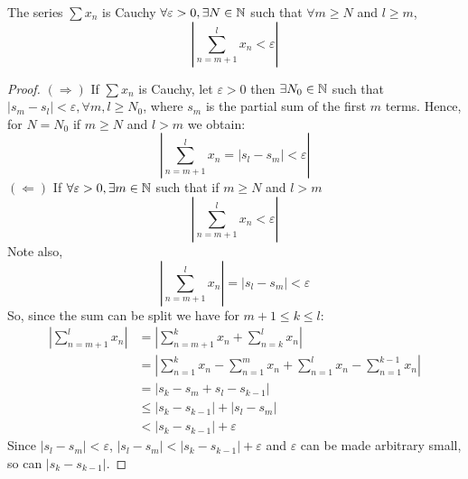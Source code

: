 \begin{theorem}
    The series $\sum x_n$ is Cauchy $\forall \varepsilon > 0, \exists N \in \mathbb{N}$ such that $\forall m \geq N$ and $l \geq m$,
    \begin{equation*}
        \left |
            \sum \limits_{n=m+1}^l x_n < \varepsilon
        \right |
    \end{equation*}
\end{theorem}

\begin{proof}
    $(\Longrightarrow)$ If $\sum x_n$ is Cauchy, let $\varepsilon > 0$ then $\exists N_0 \in \mathbb{N}$ such that $|s_m-s_l| < \varepsilon, \forall m,l \geq N_0$, where $s_m$ is the partial sum of the first $m$ terms. Hence, for $N = N_0$ if $m \geq N$ and $l > m$ we obtain:
    \begin{equation*}
        \left |
            \sum \limits_{n=m+1}^l x_n = |s_l - s_m| < \varepsilon
        \right |
    \end{equation*}
    $(\Longleftarrow)$ If $\forall \varepsilon > 0, \exists m \in \mathbb{N}$ such that if $m \geq N$ and $l > m$
    \begin{equation*}
        \left |
            \sum \limits_{n=m+1}^l x_n < \varepsilon
        \right |
    \end{equation*}
    Note also,
    \begin{equation*}
        \left |
            \sum \limits_{n=m+1}^l x_n
        \right | = |s_l -s_m| < \varepsilon
    \end{equation*}
    So, since the sum can be split we have for $m+1 \leq k \leq l$:
    \begin{align*}
        \left |
            \sum \limits_{n=m+1}^l x_n
        \right | &= 
        \left |
            \sum \limits_{n=m+1}^k x_n + 
            \sum \limits_{n=k}^l x_n 
        \right | \\
        &= 
        \left |
            \sum \limits_{n=1}^k x_n -
            \sum \limits_{n=1}^{m} x_n + 
            \sum \limits_{n=1}^l x_n -
            \sum \limits_{n=1}^{k-1} x_n 
        \right | \\
        &= | s_k - s_m + s_l - s_{k-1}| \\
        &\leq |s_k - s_{k-1}| + |s_l - s_m| \\
        &< |s_k - s_{k-1}| + \varepsilon
    \end{align*}
    Since $|s_l -s_m| < \varepsilon$, $|s_l -s_m| < |s_k - s_{k-1}| + \varepsilon$ and $\varepsilon$ can be made arbitrary small, so can $|s_k - s_{k-1}|$.
\end{proof}

